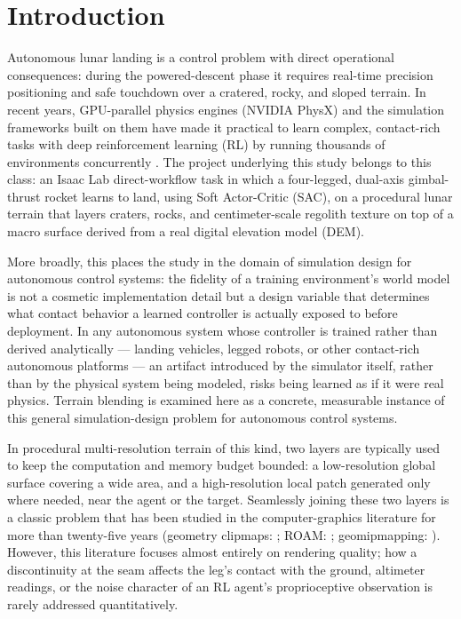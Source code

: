 \section{Introduction}
\label{sec:giris}

Autonomous lunar landing is a control problem with direct operational
consequences: during the powered-descent phase it requires real-time
precision positioning and safe touchdown over a cratered, rocky, and
sloped terrain. In recent years, GPU-parallel physics engines (NVIDIA
PhysX) and the simulation frameworks built on them have made it
practical to learn complex, contact-rich tasks with deep reinforcement
learning (RL) by running thousands of environments concurrently
\citep{mittal2023orbit,nvidia2025isaaclab,rudin2022walking}. The project
underlying this study belongs to this class: an Isaac Lab
direct-workflow task in which a four-legged, dual-axis gimbal-thrust
rocket learns to land, using Soft Actor-Critic (SAC), on a procedural
lunar terrain that layers craters, rocks, and centimeter-scale regolith
texture on top of a macro surface derived from a real digital elevation
model (DEM).

More broadly, this places the study in the domain of simulation design
for autonomous control systems: the fidelity of a training environment's
world model is not a cosmetic implementation detail but a design
variable that determines what contact behavior a learned controller is
actually exposed to before deployment. In any autonomous system whose
controller is trained rather than derived analytically --- landing
vehicles, legged robots, or other contact-rich autonomous platforms ---
an artifact introduced by the simulator itself, rather than by the
physical system being modeled, risks being learned as if it were real
physics. Terrain blending is examined here as a concrete, measurable
instance of this general simulation-design problem for autonomous
control systems.

In procedural multi-resolution terrain of this kind, two layers are
typically used to keep the computation and memory budget bounded: a
low-resolution global surface covering a wide area, and a
high-resolution local patch generated only where needed, near the agent
or the target. Seamlessly joining these two layers is a classic problem
that has been studied in the computer-graphics literature for more than
twenty-five years (geometry clipmaps: \citep{losasso2004geometry}; ROAM:
\citep{duchaineau1997roaming}; geomipmapping:
\citep{deboer2000geomipmapping}). However, this literature focuses
almost entirely on rendering quality; how a discontinuity at the seam
affects the leg's contact with the ground, altimeter readings, or the
noise character of an RL agent's proprioceptive observation is rarely
addressed quantitatively.

